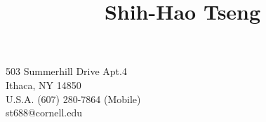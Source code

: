 \documentclass{article}
\begin{document}
 
\title{Shih-Hao Tseng}{
503 Summerhill Drive Apt.4\\
Ithaca, NY 14850 \\
U.S.A.
}{
(607) 280-7864 (Mobile) \\
st688@cornell.edu
}











\newpage


\end{document}
